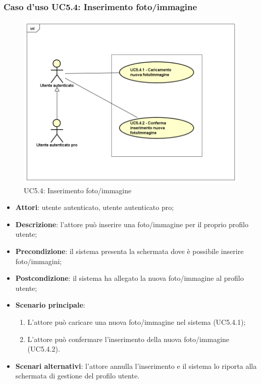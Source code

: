 \subsubsection{Caso d'uso UC5.4: Inserimento foto/immagine}
\label{UC5.4}
\begin{figure}[h]
	\centering
	\includegraphics[scale=0.5,keepaspectratio]{UML/UC5_4.png}
	\caption{UC5.4: Inserimento foto/immagine}
\end{figure}
\begin{itemize}
	\item \textbf{Attori}: utente autenticato, utente autenticato pro;
	\item \textbf{Descrizione}: l'attore può inserire una foto/immagine per il proprio profilo utente;
	\item \textbf{Precondizione}: il sistema presenta la schermata dove è possibile inserire foto/immagini;
	\item \textbf{Postcondizione}: il sistema ha allegato la nuova foto/immagine al profilo utente;
	\item \textbf{Scenario principale}:
	\begin{enumerate}
		\item L'attore può caricare una nuova foto/immagine nel sistema (UC5.4.1);
		\item L'attore può confermare l'inserimento della nuova foto/immagine (UC5.4.2).
	\end{enumerate}
	\item \textbf{Scenari alternativi}: l'attore annulla l'inserimento e il sistema lo riporta alla schermata di gestione del profilo utente.
\end{itemize}

